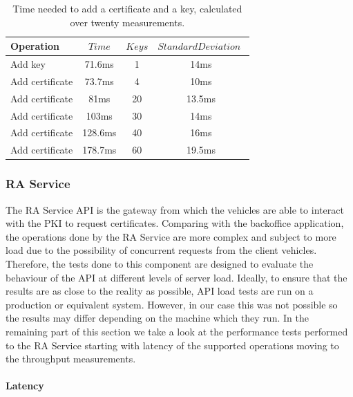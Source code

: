 \begin{table}
	\renewcommand{\arraystretch}{1.2} %
	\centering
	\begin{tabular}{lccc}
		\toprule
		Operation           & $Time$ & $Keys$& $StandardDeviation$ $$\\
		\midrule
		Add key          & 71.6ms & 1 & 14ms   \\
		Add certificate  & 73.7ms &4& 10ms     \\
		Add certificate  & 81ms &20& 13.5ms     \\
		Add certificate  & 103ms &30& 14ms     \\
		Add certificate  & 128.6ms &40& 16ms     \\
		Add certificate  & 178.7ms &60& 19.5ms \\
		\bottomrule
		\end{tabular}
		
		\caption{Time needed to add a certificate and a key, calculated over twenty measurements.}
		\label{tab:table1}
	\end{table}
	
	\subsubsection{RA Service}
	
	The RA Service API is the gateway from which the vehicles are able to interact with the PKI to request certificates. Comparing with the backoffice application, the operations done by the RA Service are more complex and subject to more load due to the possibility of concurrent requests from the client vehicles. Therefore, the tests done to this component are designed to evaluate the behaviour of the API at different levels of server load. Ideally, to ensure that the results are as close to the reality as possible, API load tests are run on a production or equivalent system. However, in our case this was not possible so the results may differ depending on the machine which they run. In the remaining part of this section we take a look at the performance tests performed to the RA Service starting with latency of the supported operations moving to the throughput measurements. 
	
	\paragraph{Latency}
	
